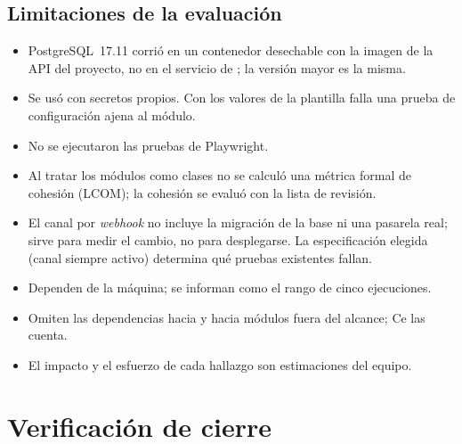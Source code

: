 \documentclass[11pt,a4paper]{article}
\begin{document}
\subsection{Limitaciones de la evaluación}\label{sec:limitaciones}

\begin{itemize}
  \item {} PostgreSQL~17.11 corrió en un contenedor desechable con la imagen de la API del proyecto, no en el servicio  de ; la versión mayor es la misma.
  \item {} Se usó  con secretos propios. Con los valores de la plantilla falla una prueba de configuración ajena al módulo.
  \item {} No se ejecutaron las pruebas de Playwright.
  \item {} Al tratar los módulos como clases no se calculó una métrica formal de cohesión (LCOM); la cohesión se evaluó con la lista de revisión.
  \item {} El canal por \emph{webhook} no incluye la migración de la base ni una pasarela real; sirve para medir el cambio, no para desplegarse. La especificación elegida (canal siempre activo) determina qué pruebas existentes fallan.
  \item {} Dependen de la máquina; se informan como el rango de cinco ejecuciones.
  \item {} Omiten las dependencias hacia  y hacia módulos fuera del alcance; Ce las cuenta.
  \item {} El impacto y el esfuerzo de cada hallazgo son estimaciones del equipo.
\end{itemize}

\section{Verificación de cierre}
\end{document}
